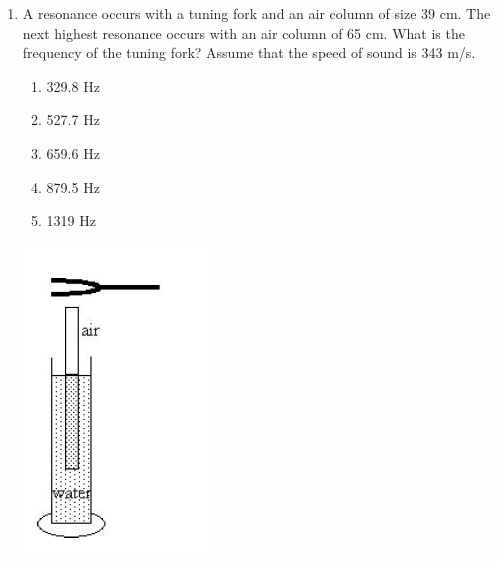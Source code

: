 ﻿\documentclass[12pt, a4paper]{article}
\begin{document}
\begin{CJK*}{UTF8}{gbsn}
\begin{enumerate}[itemsep=1.0em, topsep=0.6em]
\item \label{prob:3}
\noindent\begin{minipage}[t]{0.6\linewidth}
\vspace{0pt} %
A resonance occurs with a tuning fork and an air column of size 39 cm. The next highest resonance occurs with an air column of 65 cm. What is the frequency of the tuning fork? Assume that the speed of sound is 343 m/s.
\begin{enumerate}[label=(\Alph*)]
    \item 329.8 Hz
    \item 527.7 Hz
    \item 659.6 Hz
    \item 879.5 Hz
    \item 1319 Hz
\end{enumerate}
\end{minipage}%
\hfill
\begin{minipage}[t]{0.33\linewidth}
\vspace{0pt} %
\centering
\includegraphics[width=0.7\linewidth]{Problem_03_Figure.png}
\end{minipage}


\end{enumerate}
\end{CJK*}
\end{document}
